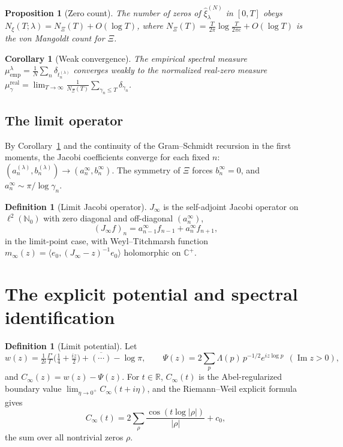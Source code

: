 \documentclass[11pt]{amsart}
\newtheorem{proposition}[theorem]{Proposition}
\newtheorem{corollary}[theorem]{Corollary}
\theoremstyle{definition}
\newtheorem{definition}[theorem]{Definition}
\theoremstyle{remark}
\renewcommand{\Im}{\operatorname{Im}}
\newcommand{\Cinf}{C_\infty}
\newcommand{\Jinf}{J_\infty}
\newcommand{\gamn}{\gamma_n}
\begin{document}
\begin{proposition}[Zero count]\label{prop:count}
The number of zeros of $\widehat\xi_\lambda^{(N)}$ in $[0,T]$ obeys
$N_\xi(T;\lambda)=N_\Xi(T)+O(\log T)$, where $N_\Xi(T)=\frac{T}{2\pi}\log\frac{T}{2\pi e}+
O(\log T)$ is the von Mangoldt count for $\Xi$.
\end{proposition}

\begin{corollary}[Weak convergence]\label{cor:weak}
The empirical spectral measure $\mu^\lambda_{\mathrm{emp}}=\frac1N\sum_n\delta_{t_n^{(\lambda)}}$
converges weakly to the normalized real-zero measure
$\mu_\gamma^{\mathrm{real}}=\lim_{T\to\infty}\frac1{N_\Xi(T)}\sum_{\gamma_n\le T}\delta_{\gamn}$.
\end{corollary}

\subsection{The limit operator}
By Corollary~\ref{cor:weak} and the continuity of the Gram--Schmidt recursion in the first
moments, the Jacobi coefficients converge for each fixed $n$:
$(a_n^{(\lambda)},b_n^{(\lambda)})\to(a_n^\infty,b_n^\infty)$. The symmetry of $\Xi$ forces
$b_n^\infty=0$, and $a_n^\infty\sim\pi/\log\gamn$.

\begin{definition}[Limit Jacobi operator]\label{def:jinf}
$\Jinf$ is the self-adjoint Jacobi operator on $\ell^2(\mathbb N_0)$ with zero diagonal and
off-diagonal $(a_n^\infty)$,
\[
(\Jinf f)_n=a_{n-1}^\infty f_{n-1}+a_n^\infty f_{n+1},
\]
in the limit-point case, with Weyl--Titchmarsh function
$m_\infty(z)=\langle e_0,(\Jinf-z)^{-1}e_0\rangle$ holomorphic on $\mathbb C^+$.
\end{definition}

\section{The explicit potential and spectral identification}\label{sec:potential}

\begin{definition}[Limit potential]\label{def:cinf}
Let
\[
w(z)=\tfrac1{2i}\tfrac{\Gamma'}{\Gamma}\!\big(\tfrac14+\tfrac{iz}{2}\big)+\overline{(\cdots)}
-\log\pi,\qquad
\Psi(z)=2\sum_p\Lambda(p)\,p^{-1/2}e^{iz\log p}\ \ (\Im z>0),
\]
and $\Cinf(z)=w(z)-\Psi(z)$. For $t\in\mathbb R$, $\Cinf(t)$ is the Abel-regularized boundary
value $\lim_{\eta\to0^+}\Cinf(t+i\eta)$, and the Riemann--Weil explicit formula gives
\[
\Cinf(t)=2\sum_\rho\frac{\cos(t\log|\rho|)}{|\rho|}+c_0,
\]
the sum over all nontrivial zeros $\rho$.
\end{definition}
\end{document}
